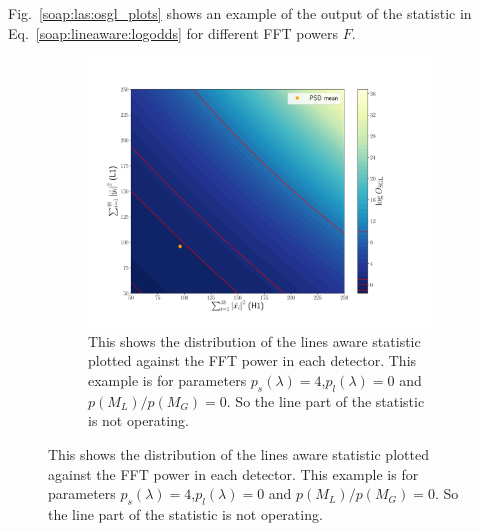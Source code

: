 Fig.~\ref{soap:las:osgl_plots} shows an example of the output of the statistic in Eq.~\ref{soap:lineaware:logodds} for different \gls{FFT} powers $F$.
\begin{figure}
\centering

\begin{subfigure}[h]{\linewidth}
\begin{minipage}{0.65\linewidth}
\includegraphics[width=1.\linewidth]{C3_soap/lookup_noline.pdf}
\end{minipage}\hfill
\begin{minipage}{0.35\linewidth}
\caption{This shows the distribution of the lines aware statistic plotted against the \gls{FFT} power in each detector. This example is for parameters $p_s(\lambda) = 4$,$p_l(\lambda) = 0$ and $p(M_L)/p(M_G) = 0$. So the line part of the statistic is not operating.}
\label{soap:las:detp:noline}
\end{minipage}
\end{subfigure}


\end{figure}
